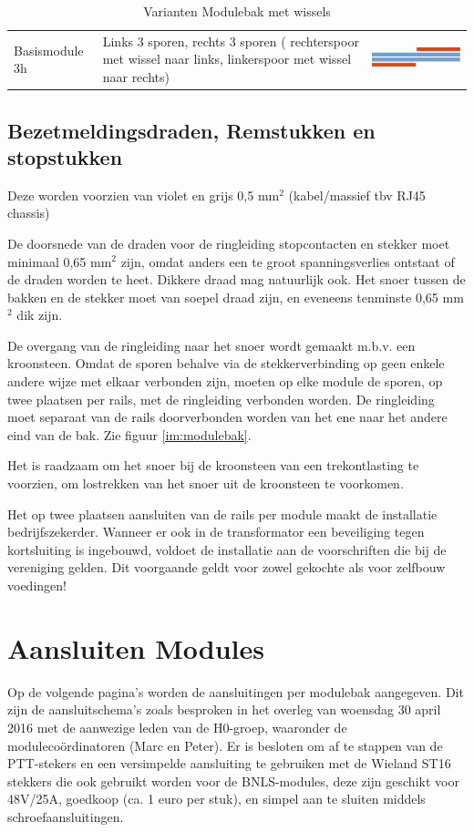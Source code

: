 \documentclass[12pt,a4paper]{report}
\begin{document}
\begin{table}[h!]
{\begin{tabular}{| l | m{7cm} | m{7cm} |}
\hline
Basismodule 3h&Links 3 sporen, rechts 3 sporen ( rechterspoor met wissel naar links, linkerspoor met wissel naar rechts)&\parbox[c]{1em} {\includegraphics[width=7cm]{images/module_3h}} \\
\hline
\end{tabular}
}
\caption{Varianten Modulebak met wissels}
\end{table}

\subsection{Bezetmeldingsdraden, Remstukken en stopstukken}
Deze worden voorzien van  violet en grijs  0,5 mm$^{2}$ (kabel/massief tbv RJ45 chassis)

De doorsnede van de draden voor de ringleiding stopcontacten en stekker moet minimaal 0,65 mm$^{2}$ zijn, omdat anders een te groot spanningsverlies ontstaat of de draden worden te heet. Dikkere draad mag natuurlijk ook.
Het snoer tussen de bakken en de stekker moet van soepel draad zijn, en eveneens tenminste 0,65 mm$^{2}$ dik zijn.

De overgang van de ringleiding naar het snoer wordt gemaakt m.b.v. een kroonsteen. Omdat de sporen behalve via de stekkerverbinding op geen enkele andere wijze met elkaar verbonden zijn, moeten op elke module de sporen, op twee plaatsen per rails, met de ringleiding verbonden worden. De ringleiding moet separaat van de rails doorverbonden worden van het ene naar het andere eind van de bak. Zie figuur \ref{im:modulebak}.

Het is raadzaam om het snoer bij de kroonsteen van een trekontlasting te voorzien, om lostrekken van het snoer uit de kroonsteen te voorkomen.

Het op twee plaatsen aansluiten van de rails per module maakt de installatie bedrijfszekerder. Wanneer er ook in de transformator een beveiliging tegen kortsluiting is ingebouwd, voldoet de installatie aan de voorschriften die bij de vereniging gelden. Dit voorgaande geldt voor zowel gekochte als voor zelfbouw voedingen!

\section{Aansluiten Modules}
Op de volgende pagina's worden de aansluitingen per modulebak aangegeven.
Dit zijn de aansluitschema's zoals besproken in het overleg van woensdag 30 april 2016 met de aanwezige leden van de H0-groep, waaronder de moduleco\"{o}rdinatoren (Marc en Peter).
Er is besloten om af te stappen van de PTT-stekers en een versimpelde aansluiting te gebruiken met de Wieland ST16 stekkers die ook gebruikt worden voor de BNLS-modules, deze zijn geschikt voor 48V/25A, goedkoop (ca. 1 euro per stuk), en simpel aan te sluiten middels schroefaansluitingen.
\end{document}
